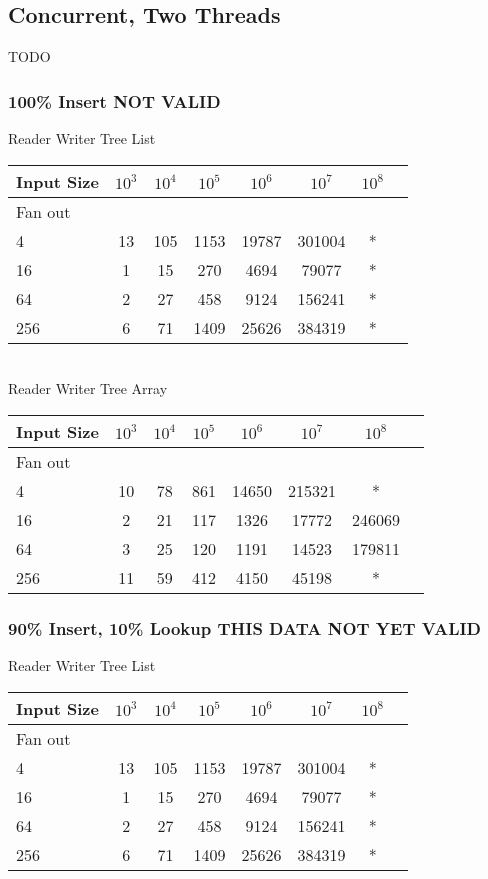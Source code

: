 \documentclass{sig-alternate}
\begin{document}
\subsection{Concurrent, Two Threads}
TODO

\subsubsection{100\% Insert NOT VALID}
Reader Writer Tree List \\
\begin{tabular}{| l | c | c | c | c | c | c | r}
  \hline
  Input Size & $10^3$ & $10^4$ & $10^5$ & $10^6$ & $10^7$ & $10^8$ \\ \hline
  Fan out & & & & & &  \\  \hline
  4			&	13 & 105 & 1153 & 19787 & 301004 & * \\
  16		&	1 & 15 & 270 & 4694 & 79077 & * \\
  64		&	2 & 27 & 458 & 9124 & 156241 & * \\
  256		&	6 & 71 & 1409 & 25626 & 384319 & * \\
  \hline
\end{tabular} \\

Reader Writer Tree Array \\
\begin{tabular}{| l | c | c | c | c | c | c | r}
  \hline
  Input Size & $10^3$ & $10^4$ & $10^5$ & $10^6$ & $10^7$ & $10^8$ \\ \hline
  Fan out & & & & & &  \\  \hline
  4			&	10 & 78 & 861 & 14650 & 215321 & * \\
  16		&	2 & 21 & 117 & 1326 & 17772 & 246069 \\
  64		&	3 & 25 & 120 & 1191 & 14523 & 179811 \\
  256		&	11 & 59 & 412 & 4150 & 45198 & * \\
  \hline
\end{tabular} 


\subsubsection{90\% Insert, 10\% Lookup  THIS DATA NOT YET VALID}
Reader Writer Tree List \\
\begin{tabular}{| l | c | c | c | c | c | c | r}
  \hline
  Input Size & $10^3$ & $10^4$ & $10^5$ & $10^6$ & $10^7$ & $10^8$ \\ \hline
  Fan out & & & & & &  \\  \hline
  4			&	13 & 105 & 1153 & 19787 & 301004 & * \\
  16		&	1 & 15 & 270 & 4694 & 79077 & * \\
  64		&	2 & 27 & 458 & 9124 & 156241 & * \\
  256		&	6 & 71 & 1409 & 25626 & 384319 & * \\
  \hline
\end{tabular} \\
\end{document}
